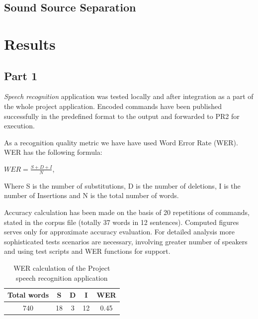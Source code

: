 \documentclass[11pt,a4paper]{report}
\begin{document}
\section{Sound Source Separation}

\chapter {Results}
\label {sec:results}
\section {Part 1}

\textit {Speech recognition} application was tested locally and after
integration as a part of the whole project application. Encoded commands have been published successfully in the
predefined format to the output and forwarded to PR2 for execution. 

 As a
recognition quality metric we have have used Word Error Rate (WER).  WER has the
following formula:
\begin {center}
$WER=\frac {S+D+I}N$, 
\end {center}
Where S is the number of substitutions, D is the number of
deletions, I is the number of Insertions and N is the total number of words.

 Accuracy calculation has been made on the basis of 20
repetitions of commands, stated in the corpus file (totally 37 words in 12 sentences). Computed figures 
serves only for approximate accuracy evaluation.  For detailed analysis more
sophisticated tests scenarios are necessary, involving greater number of
speakers and using test scripts and WER functions for support. 
\begin {table}[h]
\begin{center}
\begin{tabular}[h]{| c || c || c ||c || c|} \hline
Total words & S & D & I  & WER\\ \hline
740 & 18 & 3 & 12 & 0.45  \\
\hline
\end{tabular}
\caption {WER calculation of the Project speech recognition application}
\label {table:WER}
\end {center}  
\end {table} 
 
\end{document}
